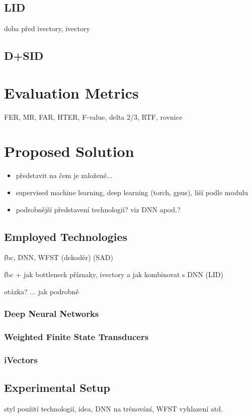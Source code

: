 \documentclass[FM,noheader,EN]{tulthesis}
\begin{document}
\section{LID}
doba před ivectory, ivectory
\section{D+SID}


\chapter{Evaluation Metrics}
FER, MR, FAR, HTER, F-value, delta 2/3, RTF, rovnice


\chapter{Proposed Solution}
\begin{itemize}
	\item představit na čem je založené...
	\item supervised machine learning, deep learning (torch, gpus), liší podle modulu
	\item podrobnější představení technologií? viz DNN apod.?
\end{itemize}

\section{Employed Technologies}
fbc, DNN, WFST (dekodér) (SAD)

fbc + jak bottleneck příznaky, ivectory a jak kombinovat s DNN (LID)

otázka? ... jak podrobně
\subsection{Deep Neural Networks}
\subsection{Weighted Finite State Transducers}
\subsection{iVectors}

\section{Experimental Setup}
styl použití technologií, idea, DNN na trénování, WFST vyhlazení atd.
\end{document}
